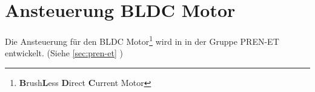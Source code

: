 \section{Ansteuerung BLDC Motor}
Die Ansteuerung für den BLDC Motor\footnote{\textbf{B}rush\textbf{L}ess 
\textbf{D}irect \textbf{C}urrent Motor} wird in in der Gruppe PREN-ET 
entwickelt. (Siehe \ref{sec:pren-et} )
